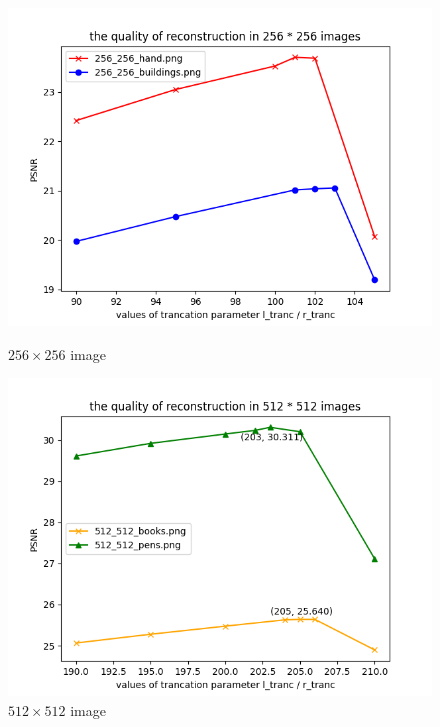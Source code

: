 \begin{figure}[H]
    \centering 
    \begin{minipage}[t]{0.3\linewidth} 
    \centering 
    \includegraphics[width=\textwidth]{quality_256_(1).png}
    \caption{$256 \times 256$ image} 
    \label{Fig.1}
    \end{minipage}
    \begin{minipage}[t]{0.3\linewidth}
    \centering 
    \includegraphics[width=\textwidth]{quality_512.png}
    \caption{$512 \times 512$ image}
    \label{Fig.2}
    \end{minipage}
    \begin{minipage}[t]{0.3\linewidth}
    \centering 

\end{minipage}
\end{figure}
